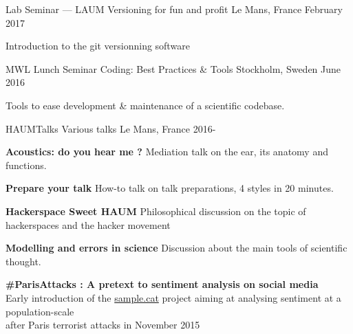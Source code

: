 

\begin{cventries}
  \cventry
    {Lab Seminar --- LAUM} %
		{Versioning for fun and profit} %
    {Le Mans, France} %
    {February 2017} %
    {
      \begin{cvitems} %
			\item {Introduction to the git versionning software}
      \end{cvitems}
    }

  \cventry
    {MWL Lunch Seminar} %
		{Coding: Best Practices \& Tools} %
    {Stockholm, Sweden} %
    {June 2016} %
    {
      \begin{cvitems} %
			\item {Tools to ease development \& maintenance of a scientific codebase.}
      \end{cvitems}
    }

  \cventry
		{HAUMTalks} %
		{Various talks} %
    {Le Mans, France} %
    {2016-} %
    {
      \begin{cvitems} %
			\item {\textbf{Acoustics: do you hear me ?} Mediation talk on the ear, its anatomy
				and functions.}
			\item {\textbf{Prepare your talk} How-to talk on talk preparations, 4 styles in 20 minutes.}
			\item {\textbf{Hackerspace Sweet HAUM} Philosophical discussion on the topic of hackerspaces and the hacker movement}
			\item {\textbf{Modelling and errors in science} Discussion about the main tools of scientific thought.}
			\item {\textbf{\#ParisAttacks : A pretext to sentiment analysis on social
				media}\\Early introduction of the \href{https://sample.cat}{sample.cat} project
				aiming at analysing sentiment at a population-scale\\after Paris terrorist attacks in November 2015}
      \end{cvitems}
    }


\end{cventries}
